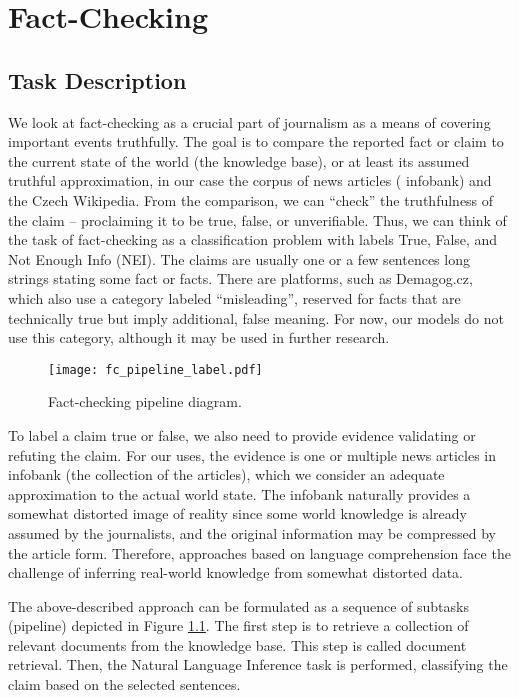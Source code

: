 \chapter{Fact-Checking}

\section{Task Description}

We look at fact-checking as a crucial part of journalism as a means of covering important events truthfully. 
The goal is to compare the reported fact or claim to the current state of the world (the knowledge base), or at least its assumed truthful approximation, in our case the corpus of \CTK{} news articles (\CTK{} infobank) and the Czech Wikipedia.
From the comparison, we can ``check'' the truthfulness of the claim -- proclaiming it to be true, false, or unverifiable. 
Thus, we can think of the task of fact-checking as a classification problem with labels True, False, and Not Enough Info (NEI). 
The claims are usually one or a few sentences long strings stating some fact or facts. 
There are platforms, such as Demagog.cz, which also use a category labeled ``misleading'', reserved for facts that are technically true but imply additional, false meaning.
For now, our models do not use this category, although it may be used in further research.

\begin{figure}[h!]
    \centering
    \texttt{[image: fc\_pipeline\_label.pdf]}
    \caption[Fact-Checking Pipeline]{Fact-checking pipeline diagram.}
    \label{fig:pipeline}
\end{figure}

To label a claim true or false, we also need to provide evidence validating or refuting the claim.
For our uses, the evidence is one or multiple news articles in \CTK{} infobank (the collection of the articles), which we consider an adequate approximation to the actual world state.
The infobank naturally provides a somewhat distorted image of reality since some world knowledge is already assumed by the journalists, and the original information may be compressed by the article form. 
Therefore, approaches based on language comprehension face the challenge of inferring real-world knowledge from somewhat distorted data. 

The above-described approach can be formulated as a sequence of subtasks (pipeline) depicted in Figure \ref{fig:pipeline}. The first step is to retrieve a collection of relevant documents from the knowledge base. This step is called document retrieval. Then, the Natural Language Inference task is performed, classifying the claim based on the selected sentences.

